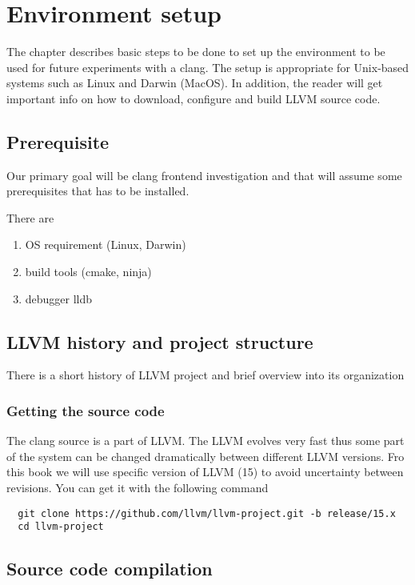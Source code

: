 \chapter{Environment setup}
The chapter describes basic steps to be done to set up the environment to be
used for future experiments with a clang. The setup is appropriate for
Unix-based systems such as Linux and Darwin (MacOS). In addition, the reader
will get important info on how to download, configure and build LLVM source
code.  


\section{Prerequisite}
Our primary goal will be clang frontend investigation and that will assume some
prerequisites that has to be installed.

There are
\begin{enumerate}
\item OS requirement (Linux, Darwin)
\item build tools (cmake, ninja)
\item debugger lldb
\end{enumerate}

\section{LLVM history and project structure}

There is a short history of LLVM project and brief overview into its
organization 

\subsection{Getting the source code}

The clang source is a part of LLVM. The LLVM evolves very fast thus some part of
the system can be changed dramatically between different LLVM versions. Fro this
book we will use specific version of LLVM (15) to avoid uncertainty between
revisions. You can get it with the following command
\begin{verbatim}
  git clone https://github.com/llvm/llvm-project.git -b release/15.x
  cd llvm-project
\end{verbatim}

\section{Source code compilation}

